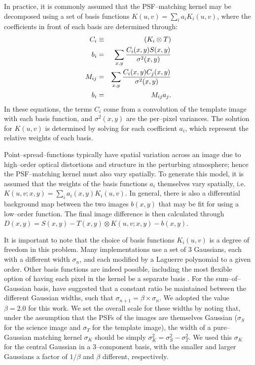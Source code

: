 \documentclass[iop]{emulateapj}
\begin{document}
In practice, it is commonly assumed that the PSF--matching kernel may be decomposed using a set of basis functions $K(u,v) = \sum_i a_i K_i(u,v)$, where the coefficients in front of each basis are determined through:
\begin{eqnarray}
\label{eq-soln}
C_i & \equiv & (K_i \otimes T) \\ 
b_{i}  & = & \sum_{x,y} {{C_i(x,y) S(x,y)}\over{\sigma^2(x,y)}}   \nonumber \\
M_{ij} & = & \sum_{x,y} {{C_i(x,y) C_j(x,y)}\over{\sigma^2(x,y)}}  \nonumber \\
b_{i}  & = & M_{ij} a_{j}. \nonumber
\end{eqnarray}
In these equations, the terms $C_i$ come from a convolution of the template image with each basis function, and $\sigma^2(x,y)$ are the per--pixel variances.
The solution for $K(u,v)$ is determined by solving for each coefficient $a_i$, which represent the relative weights of each basis.

Point--spread--functions typically have spatial variation across an image due to high--order optical distortions and structure in the perturbing atmosphere; hence the PSF--matching kernel must also vary spatially.
To generate this model, it is assumed that the weights of the basis functions $a_i$ themselves vary spatially, i.e. $K(u,v;x,y) = \sum_i a_i(x,y) K_i(u,v)$.
In general, there is also a differential background map between the two images $b(x,y)$ that may be fit for using a low--order function.
The final image difference is then calculated through $D(x,y) = S(x,y) - T(x,y) \otimes K(u,v;x,y) - b(x,y)$.

It is important to note that the choice of basis functions $K_i(u,v)$ is a degree of freedom in this problem.
Many implementations \citep{Alard98,Alard00} use a set of 3 Gaussians, each with a different width $\sigma_n$, and each modified by a Laguerre polynomial to a given order.
Other basis functions are indeed possible, including the most flexible option of having each pixel in the kernel be a separate basis \citep{bramich,becker}.
For the sum--of--Gaussian basis, \cite{2007AN....328...16I} have suggested that a constant ratio be maintained between the different Gaussian widths, such that $\sigma_{n+1} = \beta \times \sigma_{n}$.
We adopted the value $\beta = 2.0$ for this work.
We set the overall scale for these widths by noting that, under the assumption that the PSFs of the images are themselves Gaussian ($\sigma_S$ for the science image and $\sigma_T$ for the template image), the width of a pure--Gaussian matching kernel $\sigma_K$ should be simply $\sigma_K^2 = \sigma_S^2 - \sigma_T^2$.
We used this $\sigma_K$ for the central Gaussian in a 3--component basis, with the smaller and larger Gaussians a factor of $1/\beta$ and $\beta$ different, respectively.
\end{document}
